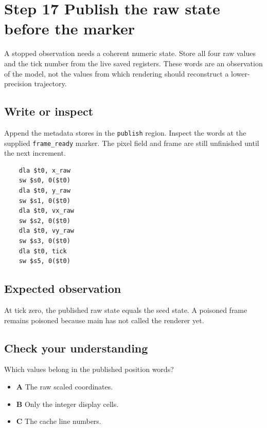\section{Step 17 Publish the raw state before the marker}\label{ball-s17}

A stopped observation needs a coherent numeric state. Store all four raw values and the tick number from the live saved registers. These words are an observation of the model, not the values from which rendering should reconstruct a lower-precision trajectory.

\subsection{Write or inspect}
Append the metadata stores in the \texttt{publish} region. Inspect the words at the supplied \texttt{frame\_ready} marker. The pixel field and frame are still unfinished until the next increment.

\begin{verbatim}
    dla $t0, x_raw
    sw $s0, 0($t0)
    dla $t0, y_raw
    sw $s1, 0($t0)
    dla $t0, vx_raw
    sw $s2, 0($t0)
    dla $t0, vy_raw
    sw $s3, 0($t0)
    dla $t0, tick
    sw $s5, 0($t0)
\end{verbatim}

\subsection{Expected observation}
At tick zero, the published raw state equals the seed state. A poisoned frame remains poisoned because main has not called the renderer yet.

\subsection{Check your understanding}
Which values belong in the published position words?

\begin{itemize}
  \item \textbf{A} The raw scaled coordinates.
  \item \textbf{B} Only the integer display cells.
  \item \textbf{C} The cache line numbers.
\end{itemize}
